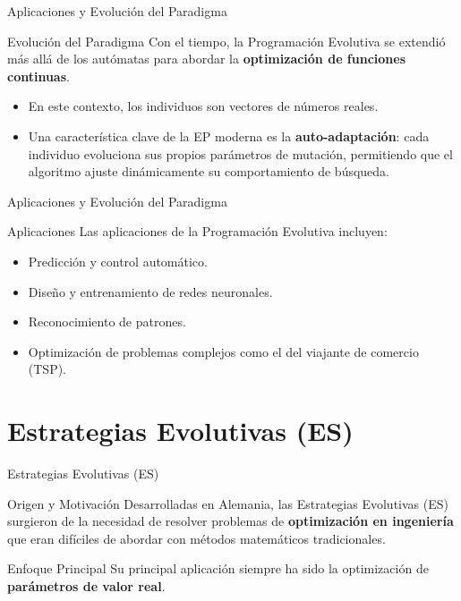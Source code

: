 \documentclass[aspectratio=169,xcolor=dvipsnames]{beamer}
\begin{document}
\begin{frame}{Aplicaciones y Evolución del Paradigma}
    \begin{block}{Evolución del Paradigma}
    Con el tiempo, la Programación Evolutiva se extendió más allá de los autómatas para abordar la \textbf{optimización de funciones continuas}.
        \begin{itemize}
            \item En este contexto, los individuos son vectores de números reales.
            \item Una característica clave de la EP moderna es la \textbf{auto-adaptación}: cada individuo evoluciona sus propios parámetros de mutación, permitiendo que el algoritmo ajuste dinámicamente su comportamiento de búsqueda.
        \end{itemize}
    \end{block}
    
   
\end{frame}
\begin{frame}{Aplicaciones y Evolución del Paradigma}

 \begin{alertblock}{Aplicaciones}
    Las aplicaciones de la Programación Evolutiva incluyen:
        \begin{itemize}
            \item Predicción y control automático.
            \item Diseño y entrenamiento de redes neuronales.
            \item Reconocimiento de patrones.
            \item Optimización de problemas complejos como el del viajante de comercio (TSP).
        \end{itemize}
    \end{alertblock}
\end{frame}

\section{Estrategias Evolutivas (ES)}

\begin{frame}{Estrategias Evolutivas (ES)}
    \begin{block}{Origen y Motivación}
    Desarrolladas en Alemania, las Estrategias Evolutivas (ES) surgieron de la necesidad de resolver problemas de \textbf{optimización en ingeniería} que eran difíciles de abordar con métodos matemáticos tradicionales.
    \end{block}
    
    \begin{alertblock}{Enfoque Principal}
    Su principal aplicación siempre ha sido la optimización de \textbf{parámetros de valor real}.
    \end{alertblock}
\end{frame}
\end{document}
